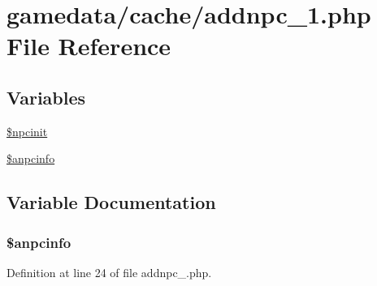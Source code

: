 \hypertarget{addnpc__1_8php}{\section{gamedata/cache/addnpc\+\_\+1.php File Reference}
\label{addnpc__1_8php}
}
\subsection*{Variables}
\begin{DoxyCompactItemize}
\item 
\hyperlink{addnpc__1_8php_a38bd0e87b769bab492d83ad186789abd}{\$npcinit}
\item 
\hyperlink{addnpc__1_8php_a9cd29cb3189c26a1a073880bc6045dbf}{\$anpcinfo}
\end{DoxyCompactItemize}


\subsection{Variable Documentation}
\hypertarget{addnpc__1_8php_a9cd29cb3189c26a1a073880bc6045dbf}{
\subsubsection[{\$anpcinfo}]{\setlength{\rightskip}{0pt plus 5cm}\$anpcinfo}}\label{addnpc__1_8php_a9cd29cb3189c26a1a073880bc6045dbf}


Definition at line 24 of file addnpc\+\_.\+php.

